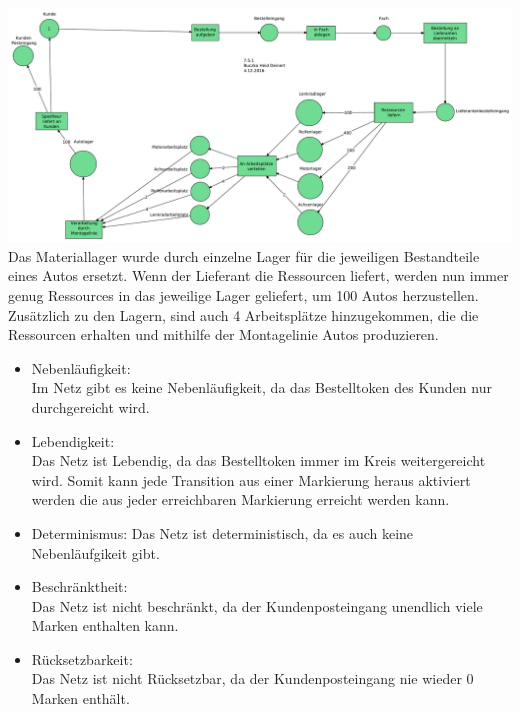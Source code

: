 \documentclass[a4paper,12pt]{scrartcl}
\begin{document}
\subsubsection{}
\includegraphics[scale=0.3]{G-6-A-07-Netz3-Buczko_Heid_Deinert.pdf}\\
Das Materiallager wurde durch einzelne Lager für
die jeweiligen Bestandteile eines Autos ersetzt.
Wenn der Lieferant die Ressourcen liefert, werden nun immer
genug Ressources in das jeweilige Lager geliefert, um 100 Autos herzustellen.
Zusätzlich zu den Lagern, sind auch 4 Arbeitsplätze hinzugekommen,
die die Ressourcen erhalten und mithilfe der Montagelinie
Autos produzieren.
\begin{itemize}
  \item{Nebenläufigkeit:}\\
  Im Netz gibt es keine Nebenläufigkeit, da das Bestelltoken des Kunden nur durchgereicht wird.
  \item{Lebendigkeit:}\\
  Das Netz ist Lebendig, da das Bestelltoken immer im Kreis weitergereicht wird. Somit kann jede Transition aus einer Markierung heraus aktiviert werden die aus jeder erreichbaren Markierung erreicht werden kann.
  \item{Determinismus:}
  Das Netz ist deterministisch, da es auch keine Nebenläufgikeit gibt.
  \item{Beschränktheit:}\\
  Das Netz ist nicht beschränkt, da der Kundenposteingang unendlich viele Marken enthalten kann.
  \item{Rücksetzbarkeit:}\\
  Das Netz ist nicht Rücksetzbar, da der Kundenposteingang nie wieder 0 Marken enthält.
\end{itemize}

\end{document}
